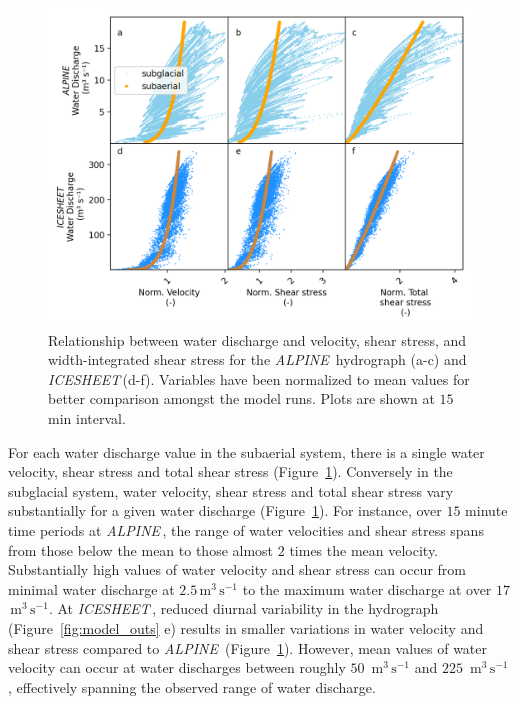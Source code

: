 \documentclass[11pt]{article}
\newcommand{\alpine}{\textit{ALPINE}\,}
\newcommand{\icesheet}{\textit{ICESHEET}\,}
\newcommand{\unit}[1]{$\mathrm{#1}$}
\begin{document}
\begin{center}
  \begin{figure}[h]
    \includegraphics[width=0.8\linewidth]{Fig3.png}
    \caption{Relationship between water discharge and velocity, shear stress, and width-integrated shear stress for the \alpine{} hydrograph (a-c) and \icesheet (d-f). Variables have been normalized to mean values for better comparison amongst the model runs.
      Plots are shown at $15$\unit{min} interval.} 
    \label{fig:Qw_vari}
  \end{figure}
\end{center}

For each water discharge value in the subaerial system, there is a single water velocity, shear stress and total shear stress (Figure~\ref{fig:Qw_vari}).
Conversely in the subglacial system,  water velocity, shear stress and total shear stress vary substantially for a given water discharge (Figure~\ref{fig:Qw_vari}).
For instance, over $15$ minute time periods at \alpine{}, the range of water velocities and shear stress spans from those below the mean to those almost $2$ times the mean velocity.
Substantially high values of water velocity and shear stress can occur from minimal water discharge at $2.5$\,\unit{m}$^3$\,\unit{s}$^{-1}$ to the maximum water discharge at over $17$ \,\unit{m}$^3$\,\unit{s}$^{-1}$.
At \icesheet, reduced diurnal variability in the hydrograph  (Figure~\ref{fig:model_outs} e) results in smaller variations in water velocity and shear stress compared to \alpine{} (Figure~\ref{fig:Qw_vari}).
However, mean values of water velocity can occur at water discharges between roughly $50$ \,\unit{m}$^3$\,\unit{s}$^{-1}$ and $225$ \,\unit{m}$^3$\,\unit{s}$^{-1}$, effectively spanning the observed range of water discharge. 
\end{document}
